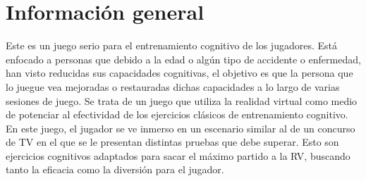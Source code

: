 
\pagestyle{fancy}
\fancyhead[LE,RO]{\thepage}
\fancyhead[LO]{\nouppercase{\rightmark}}

\label{sec:apendice:GDD}


\minitoc

\section{Información general}


Este es un juego serio para el entrenamiento cognitivo de los jugadores. Está enfocado a personas que debido a la edad o algún tipo de accidente o enfermedad, han visto reducidas sus capacidades cognitivas, el objetivo es que la persona que lo juegue vea mejoradas o restauradas dichas capacidades a lo largo de varias sesiones de juego. 
Se trata de un juego que utiliza la realidad virtual como medio de potenciar al efectividad de los ejercicios clásicos de entrenamiento cognitivo. En este juego, el jugador se ve inmerso en un escenario similar al de un concurso de TV en el que se le presentan distintas pruebas que debe superar. Esto son ejercicios cognitivos adaptados para sacar el máximo partido a la RV, buscando tanto la eficacia como la diversión para el jugador. 





